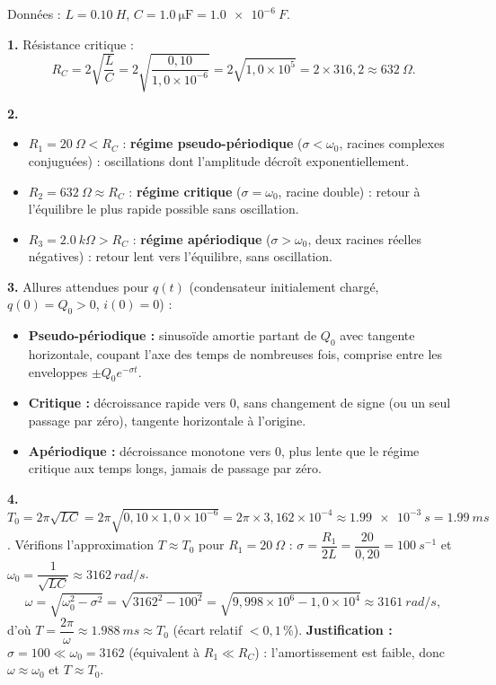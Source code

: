 \documentclass[11pt]{article}
\begin{document}
\begin{corrige}
Données : $L = \SI{0,10}{H}$, $C = \SI{1,0}{\micro\farad} = \SI{1,0e-6}{F}$.

\textbf{1.} Résistance critique :
\[
R_C = 2\sqrt{\dfrac{L}{C}} = 2\sqrt{\dfrac{0,10}{1,0\times10^{-6}}} = 2\sqrt{1,0\times10^{5}} = 2 \times 316,2 \approx \SI{632}{\Omega}.
\]

\textbf{2.}
\begin{itemize}
\item $R_1 = \SI{20}{\Omega} < R_C$ : \textbf{régime pseudo-périodique} ($\sigma < \omega_0$, racines complexes conjuguées) : oscillations dont l'amplitude décroît exponentiellement.
\item $R_2 = \SI{632}{\Omega} \approx R_C$ : \textbf{régime critique} ($\sigma = \omega_0$, racine double) : retour à l'équilibre le plus rapide possible sans oscillation.
\item $R_3 = \SI{2,0}{k\Omega} > R_C$ : \textbf{régime apériodique} ($\sigma > \omega_0$, deux racines réelles négatives) : retour lent vers l'équilibre, sans oscillation.
\end{itemize}

\textbf{3.} Allures attendues pour $q(t)$ (condensateur initialement chargé, $q(0) = Q_0 > 0$, $i(0) = 0$) :
\begin{itemize}
\item \textbf{Pseudo-périodique :} sinusoïde amortie partant de $Q_0$ avec tangente horizontale, coupant l'axe des temps de nombreuses fois, comprise entre les enveloppes $\pm Q_0 e^{-\sigma t}$.
\item \textbf{Critique :} décroissance rapide vers 0, sans changement de signe (ou un seul passage par zéro), tangente horizontale à l'origine.
\item \textbf{Apériodique :} décroissance monotone vers 0, plus lente que le régime critique aux temps longs, jamais de passage par zéro.
\end{itemize}

\textbf{4.} $T_0 = 2\pi\sqrt{LC} = 2\pi\sqrt{0,10 \times 1,0\times10^{-6}} = 2\pi \times 3,162\times10^{-4} \approx \SI{1,99e-3}{s} = \SI{1,99}{ms}$.
Vérifions l'approximation $T \approx T_0$ pour $R_1 = \SI{20}{\Omega}$ :
$\sigma = \dfrac{R_1}{2L} = \dfrac{20}{0,20} = \SI{100}{s^{-1}}$ et $\omega_0 = \dfrac{1}{\sqrt{LC}} \approx \SI{3162}{rad/s}$.
\[
\omega = \sqrt{\omega_0^2 - \sigma^2} = \sqrt{3162^2 - 100^2} = \sqrt{9,998\times10^{6} - 1,0\times10^{4}} \approx \SI{3161}{rad/s},
\]
d'où $T = \dfrac{2\pi}{\omega} \approx \SI{1,988}{ms} \approx T_0$ (écart relatif $< 0,1\,\%$).
\textbf{Justification :} $\sigma = 100 \ll \omega_0 = 3162$ (équivalent à $R_1 \ll R_C$) : l'amortissement est faible, donc $\omega \approx \omega_0$ et $T \approx T_0$.
\end{corrige}
\end{document}
